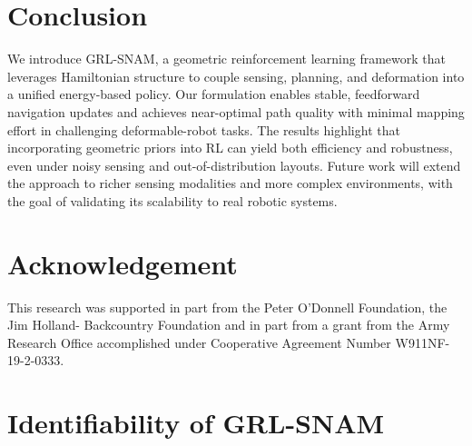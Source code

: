 \documentclass{article} %
\begin{document}


\section{Conclusion}
We introduce GRL-SNAM, a {geometric} reinforcement learning framework that leverages Hamiltonian structure to couple sensing, planning, and deformation into a unified energy-based policy. Our formulation enables stable, feedforward navigation updates and achieves near-optimal path quality with minimal mapping effort in challenging deformable-robot tasks. The results highlight that incorporating geometric priors into RL can yield both efficiency and robustness, even under noisy sensing and out-of-distribution layouts. Future work will extend the approach to richer sensing modalities and more complex environments, with the goal of validating its scalability to real robotic systems.

\section*{Acknowledgement}
This research was supported in part  from the Peter O’Donnell Foundation, the Jim Holland- Backcountry Foundation and in part from a grant from the Army Research Office accomplished under Cooperative Agreement Number W911NF-19-2-0333.
\newpage




\appendix

\newpage
\appendix

\section{Identifiability of GRL-SNAM}
\label{app:proof:and:lemma}
\end{document}

